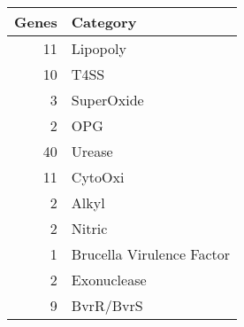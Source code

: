 \begin{table}[ht]
\centering
\begin{tabular}{rl}
  \hline
Genes & Category \\ 
  \hline
 11 & Lipopoly \\ 
   10 & T4SS \\ 
    3 & SuperOxide \\ 
    2 & OPG \\ 
   40 & Urease \\ 
   11 & CytoOxi \\ 
    2 & Alkyl \\ 
    2 & Nitric \\ 
    1 & Brucella Virulence Factor \\ 
    2 & Exonuclease \\ 
    9 & BvrR/BvrS \\ 
   \hline
\end{tabular}
\end{table}
